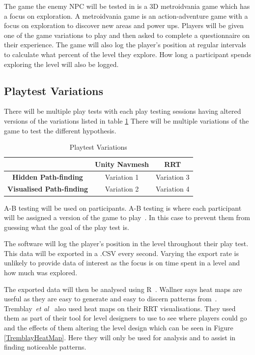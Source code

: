 \documentclass[journal]{IEEEtran}
\begin{document}
The game the enemy NPC will be tested in is a 3D metroidvania game which has a focus on exploration. A metroidvania game is an action-adventure game with a focus on exploration to discover new areas and power ups. Players will be given one of the game variations to play and then asked to complete a questionnaire on their experience. The game will also log the player's position at regular intervals to calculate what percent of the level they explore. How long a participant spends exploring the level will also be logged.

\subsection{Playtest Variations}
There will be multiple play tests with each play testing sessions having altered versions of the variations listed in table \ref{table:PlaytestVariations} 
There will be multiple variations of the game to test the different hypothesis. 


\begin{table}[ht]
	\centering
	\caption{Playtest Variations}
	\label{table:PlaytestVariations}
	\def\arraystretch{1.5}
	\begin{tabular}{ |c |c |c |}
		\hline
			  							& \textbf{Unity Navmesh}& \textbf{RRT} \\
		\hline
		\textbf{Hidden Path-finding}	& Variation 1			& Variation 3 \\
		\hline
		\textbf{Visualised Path-finding}& Variation 2		  	& Variation 4 \\
		\hline
	\end{tabular}
\end{table}


A-B testing will be used on participants. A-B testing is where each participant will be assigned a version of the game to play~\cite{Hynninen2014}. In this case to prevent them from guessing what the goal of the play test is. 

The software will log the player's position in the level throughout their play test. This data will be exported in a .CSV every second. Varying the export rate is unlikely to provide data of interest as the focus is on time spent in a level and how much was explored. 

The exported data will then be analysed using R~\cite{software:R}. Wallner says heat maps are useful as they are easy to generate and easy to discern patterns from~\cite{Wallner2015}.  Tremblay~\textit{et al}~\cite{Tremblay2014} also used heat maps on their RRT visualisations. They used them as part of their tool for level designers to use to see where players could go and the effects of them altering the level design which can be seen in Figure \ref{TremblayHeatMap}. Here they will only be used for analysis and to assist in finding noticeable patterns.
\end{document}
